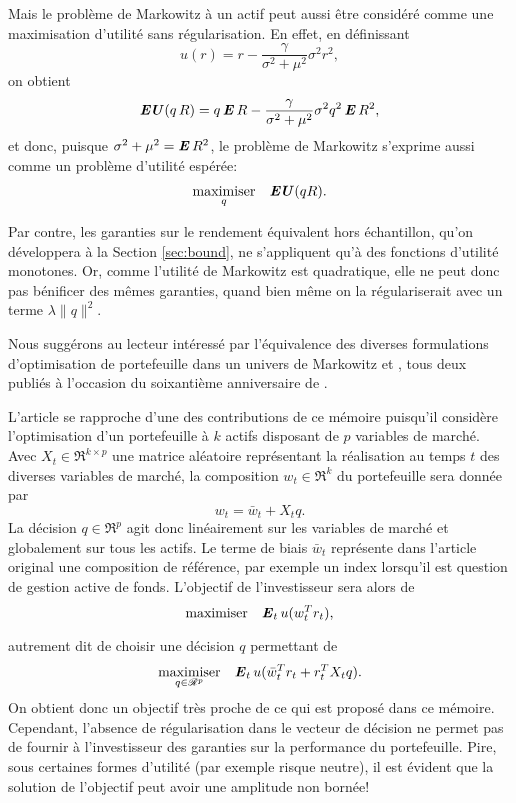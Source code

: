Mais le problème de Markowitz à un actif peut aussi être considéré comme une maximisation
d'utilité sans régularisation. En effet, en définissant
\begin{equation}
  u(r) = r - \frac{\gamma}{\sigma^2+\mu^2}\sigma^2r^2,
\end{equation}
on obtient
\begin{equation}
  \EU(q\,R) = q \E R - \frac{\gamma}{\sigma^2+\mu^2}\sigma^2 q^2\E R^2,
\end{equation}
et donc, puisque $\sigma^2 + \mu^2 = \E R^2$, le problème de Markowitz s'exprime aussi comme un
problème d'utilité espérée:
\begin{equation}
  \maximizeEquation[q]{\EU(qR).}
\end{equation}

Par contre, les garanties sur le rendement équivalent hors échantillon, qu'on développera
à la Section \ref{sec:bound}, ne s'appliquent qu'à des fonctions d'utilité monotones. Or,
comme l'utilité de Markowitz est quadratique, elle ne peut donc pas bénificer des mêmes
garanties, quand bien même on la régulariserait avec un terme $\lambda\|q\|^2$.

Nous suggérons au lecteur intéressé par l'équivalence des diverses formulations
d'optimisation de portefeuille dans un univers de Markowitz \cite{bodnar2013equivalence}
et \cite{markowitz2014mean}, tous deux publiés à l'occasion du soixantième anniversaire de
\cite{markowitz1952portfolio}.


L'article \cite{brandt2009parametric} se rapproche d'une des contributions de ce mémoire
puisqu'il considère l'optimisation d'un portefeuille à $k$ actifs disposant de $p$
variables de marché. Avec $X_t \in \Re^{k \times p}$ une matrice aléatoire représentant la
réalisation au temps $t$ des diverses variables de marché, la composition $w_t \in \Re^k$ du
portefeuille sera donnée par
\begin{equation}
  w_t = \bar w_t + X_t q.
\end{equation}
La décision $q \in \Re^p$ agit donc linéairement sur les variables de marché et globalement
sur tous les actifs. Le terme de biais $\bar w_t$ représente dans l'article original une
composition de référence, par exemple un index lorsqu'il est question de gestion active de
fonds. L'objectif de l'investisseur sera alors de
\begin{equation}
  \maximizeEquation{\E_t u(w_t^Tr_t),}
\end{equation}
autrement dit de choisir une décision $q$ permettant de
\begin{equation}
  \maximizeEquation[q \in \Re^p]{\E_t u(\bar w_t^Tr_t + r_t^TX_tq).}
\end{equation}
On obtient donc un objectif très proche de ce qui est proposé dans ce mémoire. Cependant,
l'absence de régularisation dans le vecteur de décision ne permet pas de fournir à
l'investisseur des garanties sur la performance du portefeuille. Pire, sous certaines
formes d'utilité (par exemple risque neutre), il est évident que la solution de l'objectif
peut avoir une amplitude non bornée!

